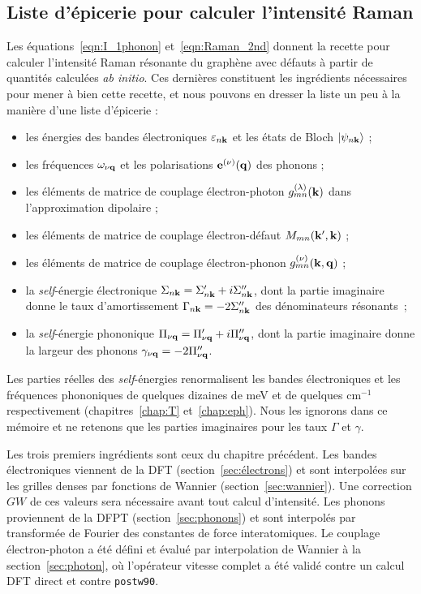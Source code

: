 \subsection{Liste d'épicerie pour calculer l'intensité Raman}\label{sec:liste}

Les équations~\eqref{eqn:I_1phonon} et~\eqref{eqn:Raman_2nd} donnent la recette pour calculer l'intensité Raman résonante du graphène avec défauts à partir de quantités calculées \textit{ab initio}. Ces dernières constituent les ingrédients nécessaires pour mener à bien cette recette, et nous pouvons en dresser la liste un peu à la manière d'une liste d'épicerie :
\begin{itemize}
    \item les énergies des bandes électroniques $\varepsilon_{n\mathbf{k}}$ et les états de Bloch $\ket{\psi_{n\mathbf{k}}}$ ;
    \item les fréquences $\omega_{\nu\mathbf{q}}$ et les polarisations $\mathbf{e}^{(\nu)}(\mathbf{q})$ des phonons ;
    \item les éléments de matrice de couplage électron-photon $g_{mn}^{(\lambda)}(\mathbf{k})$ dans l'approximation dipolaire ;
    \item les éléments de matrice de couplage électron-défaut $M_{mn}(\mathbf{k}',\mathbf{k})$ ;
    \item les éléments de matrice de couplage électron-phonon $g_{mn}^{(\nu)}(\mathbf{k},\mathbf{q})$ ;
    \item la \textit{self}-énergie électronique $\Sigma_{n\mathbf{k}}=\Sigma_{n\mathbf{k}}'+i\Sigma_{n\mathbf{k}}''$, dont la partie imaginaire donne le taux d'amortissement $\Gamma_{n\mathbf{k}}=-2\Sigma_{n\mathbf{k}}''$ des dénominateurs résonants~;
    \item la \textit{self}-énergie phononique $\Pi_{\nu\mathbf{q}} = \Pi_{\nu\mathbf{q}}'+i\Pi_{\nu\mathbf{q}}''$, dont la partie imaginaire donne la largeur des phonons $\gamma_{\nu\mathbf{q}}=-2\Pi''_{\nu\mathbf{q}}$.
\end{itemize}

Les parties réelles des \textit{self}-énergies renormalisent les bandes électroniques et les fréquences phononiques de quelques dizaines de meV et de quelques cm$^{-1}$ respectivement (chapitres~\ref{chap:T} et~\ref{chap:eph}). Nous les ignorons dans ce mémoire et ne retenons que les parties imaginaires pour les taux $\Gamma$ et $\gamma$.

Les trois premiers ingrédients sont ceux du chapitre précédent. Les bandes électroniques viennent de la DFT (section~\ref{sec:électrons}) et sont interpolées sur les grilles denses par fonctions de Wannier (section~\ref{sec:wannier}). Une correction $GW$ de ces valeurs sera nécessaire avant tout calcul d'intensité. Les phonons proviennent de la DFPT (section~\ref{sec:phonons}) et sont interpolés par transformée de Fourier des constantes de force interatomiques. Le couplage électron-photon a été défini et évalué par interpolation de Wannier à la section~\ref{sec:photon}, où l'opérateur vitesse complet a été validé contre un calcul DFT direct et contre \texttt{postw90}.

